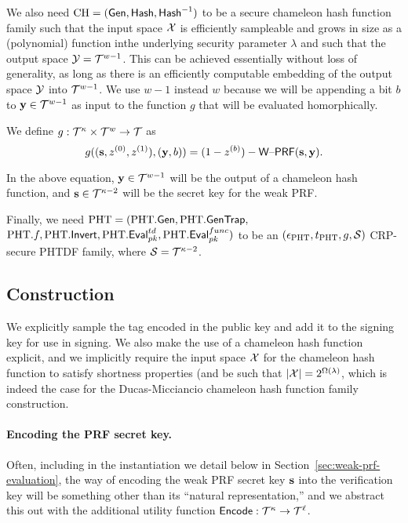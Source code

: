 We also need $\text{CH} = (\mathsf{Gen},\mathsf{Hash},\mathsf{Hash}^{-1})$ to be a secure chameleon
hash function family such that the input space $\mathcal{X}$ is efficiently
sampleable and grows in size as a
(polynomial) function inthe underlying security parameter $\lambda$
and such that the output space
$\mathcal{Y}=\mathcal{T}^{w-1}$. This can be achieved essentially without loss of
generality, as long as there is an efficiently
computable embedding of the output space $\mathcal{Y}$ into
$\mathcal{T}^{w-1}$. We use $w-1$ instead $w$ because we will be appending a
bit $b$ to $\mathbf{y} \in \mathcal{T}^{w-1}$ as input to the function $g$ that
will be evaluated homorphically.

We define $g:\mathcal{T}^{\kappa} \times \mathcal{T}^{w} \to \mathcal{T}$ as
\begin{equation}\label{eq:def-g}
g((\mathbf{s},z^{(0)},z^{(1)}),(\mathbf{y},b))=(1-z^{(b)})-\mathsf{W\text{\textendash}PRF}(\mathbf{s},\mathbf{y}).
\end{equation}

In the above equation, $\mathbf{y} \in \mathcal{T}^{w-1}$ will be the output of a
chameleon hash function, and $\mathbf{s} \in \mathcal{T}^{\kappa-2}$ will be the
secret key for the weak PRF. 



Finally, we need $\text{PHT}=(\text{PHT}.\mathsf{Gen}, \text{PHT}.\mathsf{GenTrap},$\\ 
$\text{PHT}.f,\text{PHT}.\mathsf{Invert},\text{PHT}.\mathsf{Eval}_{pk}^{td},\text{PHT}.\mathsf{Eval}_{pk}^{func})$ to be an $(\epsilon_{\text{PHT}},t_{\text{PHT}},g,\mathcal{S})$
CRP-secure PHTDF family, where $\mathcal{S}=\mathcal{T}^{\kappa-2}$. 



\subsection{Construction}
\label{sec:construction}
We explicitly sample the tag encoded in the
public key and add it to the signing key for use in
signing. We also make the use of a chameleon hash function explicit,
and we implicitly require the input space $\mathcal{X}$ for the chameleon
hash function to satisfy shortness properties (and be such that $\lvert\mathcal{X}\rvert=2^{\Omega(\lambda)}$, which is indeed the
case for the Ducas-Micciancio chameleon hash function family construction.

\paragraph{Encoding the PRF secret key.}\label{sec:prf-sec-encoding}
Often, including in the instantiation we detail below in Section~\ref{sec:weak-prf-evaluation}, the
way of encoding the weak PRF secret key $\mathbf{s}$ into the verification key
will be something other than its ``natural representation,'' and we
abstract this out with the additional utility function $\mathsf{Encode}:\mathcal{T}^{\kappa} \to \mathcal{T}^{\ell}$.



